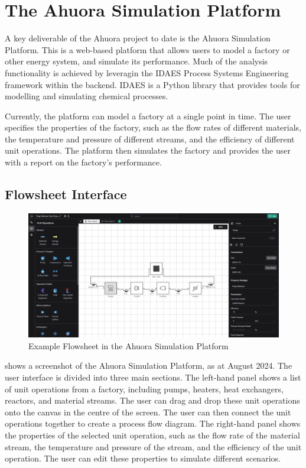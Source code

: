 \section{The Ahuora Simulation Platform}

A key deliverable of the Ahuora project to date is the Ahuora Simulation Platform. This is a web-based platform that allows users to model a factory or other energy system, and simulate its performance. Much of the analysis functionality is achieved by leveragin the IDAES Process Systems Engineering framework within the backend. IDAES is a Python library that provides tools for modelling and simulating chemical processes.

Currently, the platform can model a factory at a single point in time. The user specifies the properties of the factory, such as the flow rates of different materials, the temperature and pressure of different streams, and the efficiency of different unit operations. The platform then simulates the factory and provides the user with a report on the factory's performance.

\subsection{Flowsheet Interface}


\begin{figure}
    \centering
    \includegraphics[width=\textwidth]{platform_screenshot.png}
    \caption{Example Flowsheet in the Ahuora Simulation Platform}
    \label{fig:platform}
\end{figure}

 shows a screenshot of the Ahuora Simulation Platform, as at August 2024. The user interface is divided into three main sections. The left-hand panel shows a list of unit operations from a factory, including pumps, heaters, heat exchangers, reactors, and material streams. The user can drag and drop these unit operations onto the canvas in the centre of the screen. The user can then connect the unit operations together to create a process flow diagram. The right-hand panel shows the properties of the selected unit operation, such as the flow rate of the material stream, the temperature and pressure of the stream, and the efficiency of the unit operation. The user can edit these properties to simulate different scenarios.

